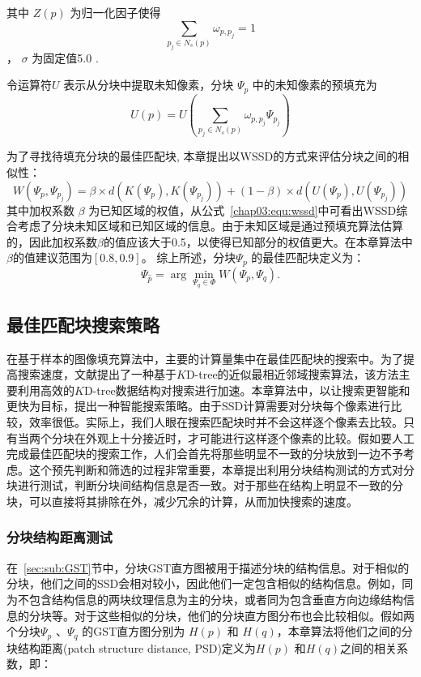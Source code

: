  其中 \(Z(p)\) 为归一化因子使得 $$\sum_{p_j\in N_s(p)}\omega_{p,p_j} = 1$$ ， \(\sigma\) 为固定值5.0 \cite{Xu:2010}.\par
 令运算符\(U\) 表示从分块中提取未知像素，分块 \(\Psi_p\) 中的未知像素的预填充为
 $$U(p)=U\left(\sum_{p_j \in N_s(p)}{\omega_{p,p_j}\Psi_{p_j}}\right)$$\par
 为了寻找待填充分块的最佳匹配块, 本章提出以WSSD的方式来评估分块之间的相似性：
 \begin{equation}
 W(\Psi_p,\Psi_{p_j})=\beta\times d(K(\Psi_p),K(\Psi_{p_j}))+(1-\beta)\times d(U(\Psi_p),U(\Psi_{p_j}))
 \label{chap03:equ:wssd}
 \end{equation}
 其中加权系数 \(\beta\) 为已知区域的权值，从公式~\ref{chap03:equ:wssd}中可看出WSSD综合考虑了分块未知区域和已知区域的信息。由于未知区域是通过预填充算法估算的，因此加权系数\(\beta\)的值应该大于0.5，以使得已知部分的权值更大。在本章算法中 \(\beta\)的值建议范围为$[0.8, 0.9]$。 综上所述，分块\(\Psi_p\) 的最佳匹配块定义为：
  $$\Psi_{\hat{p}}= \arg\min_{\Psi_q \in \Phi}{W(\Psi_p,\Psi_q)}.$$


 \subsection{最佳匹配块搜索策略}
 在基于样本的图像填充算法中，主要的计算量集中在最佳匹配块的搜索中。为了提高搜索速度，文献提出了一种基于$K$D-tree的近似最相近邻域搜索算法，该方法主要利用高效的$K$D-tree数据结构对搜索进行加速。本章算法中，以让搜索更智能和更快为目标，提出一种智能搜索策略。由于SSD计算需要对分块每个像素进行比较，效率很低。实际上，我们人眼在搜索匹配块时并不会这样逐个像素去比较。只有当两个分块在外观上十分接近时，才可能进行这样逐个像素的比较。假如要人工完成最佳匹配块的搜索工作，人们会首先将那些明显不一致的分块放到一边不予考虑。这个预先判断和筛选的过程非常重要，本章提出利用分块结构测试的方式对分块进行测试，判断分块间结构信息是否一致。对于那些在结构上明显不一致的分块，可以直接将其排除在外，减少冗余的计算，从而加快搜索的速度。
 \subsubsection{分块结构距离测试}
 \label{sec:subsub:PST}
 在~\ref{sec:sub:GST}节中，分块GST直方图被用于描述分块的结构信息。对于相似的分块，他们之间的SSD会相对较小，因此他们一定包含相似的结构信息。例如，同为不包含结构信息的两块纹理信息为主的分块，或者同为包含垂直方向边缘结构信息的分块等。对于这些相似的分块，他们的分块直方图分布也会比较相似。假如两个分块\(\Psi_p\) 、\(\Psi_q\) 的GST直方图分别为 \(H(p)\) 和 \(H(q)\)，本章算法将他们之间的分块结构距离(patch structure distance, PSD)定义为\(H(p)\) 和\(H(q)\)之间的相关系数，即：

